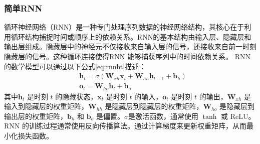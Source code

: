 \subsubsection{简单RNN}
循环神经网络（RNN）是一种专门处理序列数据的神经网络结构，其核心在于利用循环结构捕捉时间或顺序上的依赖关系\cite{elmanFindingStructureTime1990}。RNN的基本结构由输入层、隐藏层和输出层组成。隐藏层中的神经元不仅接收来自输入层的信号，还接收来自前一时刻隐藏层的信号。这种循环连接使得RNN 能够捕获序列中的时间依赖关系。
RNN的数学模型可以通过以下公式\eqref{eq:rnnht}描述：
\begin{align}
   & \mathbf{h}_t = \sigma(\mathbf{W}_{xh} \mathbf{x}_t + \mathbf{W}_{hh} \mathbf{h}_{t-1} + \mathbf{b}_h) \label{eq:rnnht} \\
   & {\mathbf{o}_t = \mathbf{W}_{ho} \mathbf{h}_t + \mathbf{b}_o} \label{eq:rnnot}
\end{align}
其中$\mathbf{h}_t$ 是时刻 $t$ 的隐藏状态，$\mathbf{x}_t$ 是时刻 $t$ 的输入，$\mathbf{o}_t$ 是时刻 $t$ 的输出，$\mathbf{W}_{xh}$ 是输入到隐藏层的权重矩阵，$\mathbf{W}_{hh}$ 是隐藏层到隐藏层的权重矩阵，$\mathbf{W}_{ho}$ 是隐藏层到输出层的权重矩阵，$\mathbf{b}_h$ 和 $\mathbf{b}_o$ 是偏置。$\sigma$是激活函数，通常使用 $\tanh$ 或 $\text{ReLU}$。RNN 的训练过程通常使用反向传播算法。通过计算梯度来更新权重矩阵，从而最小化损失函数。

